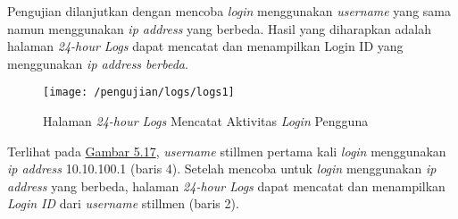 	Pengujian dilanjutkan dengan mencoba \textit{login} menggunakan \textit{username} yang sama namun menggunakan \textit{ip address} yang berbeda. Hasil yang diharapkan adalah halaman \textit{24-hour Logs} dapat mencatat dan menampilkan Login ID yang menggunakan \textit{ip address berbeda}.
	\begin{figure}[H]
		\centering  
		\texttt{[image: /pengujian/logs/logs1]}  
		\caption[Halaman \textit{24-hour Logs} Mencatat Aktivitas \textit{Login} Pengguna]{Halaman \textit{24-hour Logs} Mencatat Aktivitas \textit{Login} Pengguna} 
		\label{fig:logs1} 
	\end{figure}
	Terlihat pada \hyperref[fig:logs1]{Gambar 5.17}, \textit{username} stillmen pertama kali \textit{login} menggunakan \textit{ip address} 10.10.100.1 (baris 4). Setelah mencoba untuk \textit{login} menggunakan \textit{ip address} yang berbeda, halaman \textit{24-hour Logs} dapat mencatat dan menampilkan \textit{Login ID} dari \textit{username} stillmen (baris 2).